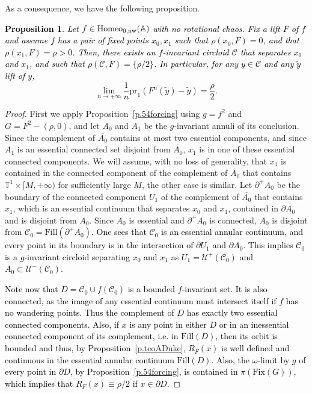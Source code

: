 \documentclass[12pt,a4paper]{amsart}
\newtheorem{prop}[thm]{Proposition}
\theoremstyle{definition}
\theoremstyle{remark}
\newcommand{\T}{\mathbb{T}}
\newcommand{\A}{\mathbb{A}}
\begin{document}
As a consequence, we have the following proposition.
\textcolor{black}{
\begin{prop}\label{t.forcing}
Let $f\in \mathrm{\normalfont{Homeo}}_{0,\mathrm{\normalfont{nw}}}(\A)$ with
no rotational chaos. Fix a lift $F$ of $f$ and assume $f$ has a pair
of fixed points $x_0,x_1$ such that $\rho(x_0,F)=0$, and that $\rho(x_1,F)=\rho>0$. Then, there exists an $f$-invariant circloid $\mathcal{C}$ that separates $x_0$ and $x_1$, and such that $\rho(\mathcal{C},F)=\{\rho/2\}$. In particular, for any $y\in \mathcal{C}$ and any $\tilde y$ lift of $y$, 
$$\lim_{n\to+\infty}\frac{1}{n}\mathrm{pr}_1(F^n(\tilde y)-\tilde y)=\frac{\rho}{2}.$$
\end{prop}}
\begin{proof}
First we apply Proposition~\ref{p.54forcing} using $g=f^2$ and $G=F^2-(\rho,0)$, and let $A_0$ and $A_1$ be the $g$-invariant annuli of its conclusion. Since the complement of $\overline{A_0}$ contains at most two essential components, and since $A_1$ is an essential connected set disjoint from $\overline{A_0}$, $x_1$ is in one of these essential connected components.  We will assume, with no loss of generality, that $x_1$ is contained in the connected component of the complement of $\overline{A_0}$ that contains $\T^1\times [M,+\infty)$ for sufficiently large $M$, the other case is similar. Let $\partial^+ A_0$ be the boundary of the connected component $U_1$ of the complement of $\overline{A_0}$ that contains $x_1$, which is an essential continuum that separates $x_0$ and $x_1$, contained in $\partial A_0$ and is disjoint from $A_0$. Since $A_0$ is essential and $\partial^{+} A_0$ is connected, $A_0$ is disjoint from \textcolor{black}{$\mathcal{C}_0=\mathrm{Fill}(\partial^{+} A_0)$. One sees that $\mathcal{C}_0$ is an essential annular continuum, and every point in its boundary is in the intersection of $\partial U_1$ and $\partial A_0$. This implies $\mathcal{C}_0$ is a $g$-invariant circloid separating $x_0$ and $x_1$ as $U_1=\mathcal{U}^{+}(\mathcal{C}_0)$ and $A_0\subset\mathcal{U}^{-}(\mathcal{C}_0)$.}

\textcolor{black}{Note now that $D=\mathcal{C}_0\cup f(\mathcal{C}_0)$ is a bounded $f$-invariant set. It is also connected, as the image of any essential continuum must intersect itself if $f$ has no wandering points. Thus the complement of $D$ has exactly two essential connected components. Also, if $x$ is any point in either $D$ or in an inessential connected component of its complement, i.e. in $\mathrm{Fill}(D)$, then its orbit is bounded and thus, by Proposition~\ref{p.teoADuke}, $R_F(x)$ is well defined and continuous in the essential annular continuum $\mathrm{Fill}(D)$. Also, the $\omega$-limit by $g$ of every point in $\partial D$, by Proposition~\ref{p.54forcing}, is contained in $\pi(\mathrm{Fix}(G))$, which implies that $R_F(x)\equiv \rho/2$ if $x\in\partial D$.}


\end{proof}
\end{document}
